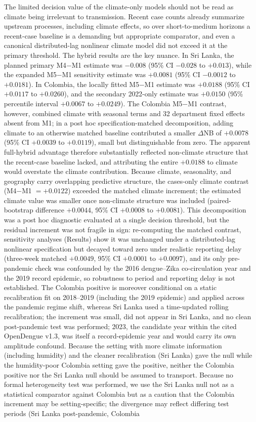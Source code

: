 \documentclass[11pt,a4paper]{article}
\begin{document}
The limited decision value of the climate-only models should not be read as climate being irrelevant to transmission. Recent case counts already summarize upstream processes, including climate effects, so over short-to-medium horizons a recent-case baseline is a demanding but appropriate comparator, and even a canonical distributed-lag nonlinear climate model did not exceed it at the primary threshold. The hybrid results are the key nuance. In Sri Lanka, the planned primary M4$-$M1 estimate was $-0.008$ (95\% CI $-0.028$ to $+0.013$), while the expanded M5$-$M1 sensitivity estimate was $+0.0081$ (95\% CI $-0.0012$ to $+0.0181$). In Colombia, the locally fitted M5$-$M1 estimate was $+0.0188$ (95\% CI $+0.0117$ to $+0.0260$), and the secondary 2022-only estimate was $+0.0150$ (95\% percentile interval $+0.0067$ to $+0.0249$). The Colombia M5$-$M1 contrast, however, combined climate with seasonal terms and 32 department fixed effects absent from M1; in a post hoc specification-matched decomposition, adding climate to an otherwise matched baseline contributed a smaller $\Delta$NB of $+0.0078$ (95\% CI $+0.0039$ to $+0.0119$), small but distinguishable from zero. The apparent full-hybrid advantage therefore substantially reflected non-climate structure that the recent-case baseline lacked, and attributing the entire $+0.0188$ to climate would overstate the climate contribution. Because climate, seasonality, and geography carry overlapping predictive structure, the cases-only climate contrast (M4$-$M1 $=+0.0122$) exceeded the matched climate increment; the estimated climate value was smaller once non-climate structure was included (paired-bootstrap difference $+0.0044$, 95\% CI $+0.0008$ to $+0.0081$). This decomposition was a post hoc diagnostic evaluated at a single decision threshold, but the residual increment was not fragile in sign: re-computing the matched contrast, sensitivity analyses (Results) show it was unchanged under a distributed-lag nonlinear specification but decayed toward zero under realistic reporting delay (three-week matched $+0.0049$, 95\% CI $+0.0001$ to $+0.0097$), and its only pre-pandemic check was confounded by the 2016 dengue--Zika co-circulation year and the 2019 record epidemic, so robustness to period and reporting delay is not established. The Colombia positive is moreover conditional on a static recalibration fit on 2018--2019 (including the 2019 epidemic) and applied across the pandemic regime shift, whereas Sri Lanka used a time-updated rolling recalibration; the increment was small, did not appear in Sri Lanka, and no clean post-pandemic test was performed; 2023, the candidate year within the cited OpenDengue v1.3, was itself a record-epidemic year and would carry its own amplitude confound. Because the setting with more climate information (including humidity) and the cleaner recalibration (Sri Lanka) gave the null while the humidity-poor Colombia setting gave the positive, neither the Colombia positive nor the Sri Lanka null should be assumed to transport. Because no formal heterogeneity test was performed, we use the Sri Lanka null not as a statistical comparator against Colombia but as a caution that the Colombia increment may be setting-specific; the divergence may reflect differing test periods (Sri Lanka post-pandemic, Colombia 
\end{document}
